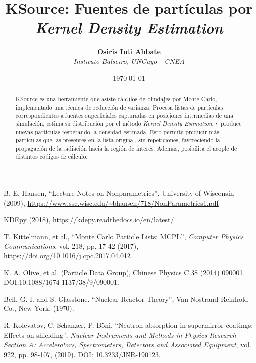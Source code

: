 \documentclass[11pt]{article}
\title{\textbf{KSource: Fuentes de partículas por \emph{Kernel Density Estimation}} \vspace{4mm} }
\author{
    \textbf{Osiris Inti Abbate} \vspace{2mm} \\
    \textit{Instituto Balseiro, UNCuyo - CNEA}
}
\date{\today}
\begin{document}
\maketitle

\begin{abstract}

KSource es una herramiente que asiste cálculos de blindajes por Monte Carlo, implementado una técnica de reducción de varianza. Procesa listas de partículas correspondientes a fuentes superficiales capturadas en posiciones intermedias de una simulación, estima su distribución por el método \emph{Kernel Density Estimation}, y produce nuevas partículas respetando la densidad estimada. Esto permite producir más partículas que las presentes en la lista original, sin repeticiones, favoreciendo la propagación de la radiación hacia la región de interés. Además, posibilita el acople de distintos códigos de cálculo.

\end{abstract}





\begin{thebibliography}{9}

     B. E. Hansen, ``Lecture Notes on Nonparametrics'', University of Wisconsin (2009), \url{https://www.ssc.wisc.edu/~bhansen/718/NonParametrics1.pdf}

     KDEpy (2018), \url{https://kdepy.readthedocs.io/en/latest/}

     T. Kittelmann, et al., ``Monte Carlo Particle Lists: MCPL'', \emph{Computer Physics Communications}, vol. 218, pp. 17-42 (2017), \url{https://doi.org/10.1016/j.cpc.2017.04.012.}

     K. A. Olive, et al. (Particle Data Group), Chinese Physics C 38 (2014) 090001. DOI:10.1088/1674-1137/38/9/090001.

     Bell, G. I. and S. Glasstone. ``Nuclear Reactor Theory'', Van Nostrand Reinhold Co., New York, (1970).

     R. Kolevatov, C. Schanzer, P. Böni, ``Neutron absorption in supermirror coatings: Effects on shielding'', \textit{Nuclear Instruments and Methods in Physics Research Section A: Accelerators, Spectrometers, Detectors and Associated Equipment}, vol. 922, pp. 98-107, (2019). DOI: \href{https://doi.org/10.1016/j.nima.2013.04.051}{10.3233/JNR-190123}.
\end{thebibliography}

\begin{appendices}
    
\end{appendices}
\end{document}

